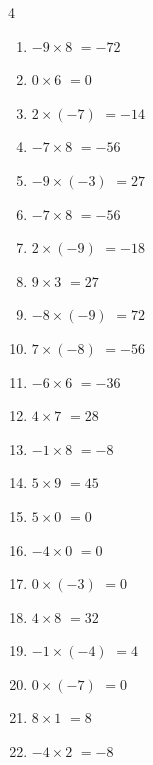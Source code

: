 \begin{multicols}{4}
\begin{enumerate}
  \item $-9\times 8$
        $=-72$

  \item $0\times 6$
        $=0$

  \item $2\times (-7)$
        $=-14$

  \item $-7\times 8$
        $=-56$

  \item $-9\times (-3)$
        $=27$

  \item $-7\times 8$
        $=-56$

  \item $2\times (-9)$
        $=-18$

  \item $9\times 3$
        $=27$

  \item $-8\times (-9)$
        $=72$

  \item $7\times (-8)$
        $=-56$

  \item $-6\times 6$
        $=-36$

  \item $4\times 7$
        $=28$

  \item $-1\times 8$
        $=-8$

  \item $5\times 9$
        $=45$

  \item $5\times 0$
        $=0$

\columnbreak %

  \item $-4\times 0$
        $=0$

  \item $0\times (-3)$
        $=0$

  \item $4\times 8$
        $=32$

  \item $-1\times (-4)$
        $=4$

  \item $0\times (-7)$
        $=0$

  \item $8\times 1$
        $=8$

  \item $-4\times 2$
        $=-8$


\end{enumerate}
\end{multicols}

